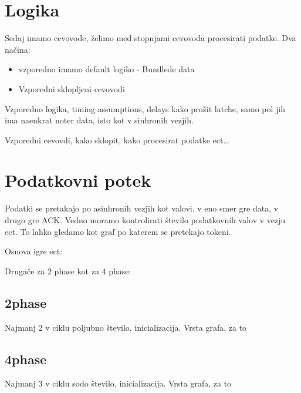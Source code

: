 %
%
%
%

\section{Logika} \label{a}

Sedaj imamo cevovode, želimo med stopnjami cevovoda procesirati podatke. Dva načina:
\begin{itemize}
	\item vzporedno imamo default logiko - Bundlede data
	\item Vzporedni sklopljeni cevovodi
\end{itemize}

Vzporedno logika, timing assumptions, delays kako prožit latche, samo pol jih ima naenkrat noter data, isto kot v sinhronih vezjih.

Vzporedni cevovdi, kako sklopit, kako procesirat podatke ect...






\section{Podatkovni potek} \label{a}
Podatki se pretakajo po asinhronih vezjih kot valovi. v eno smer gre data, v drugo gre ACK. Vedno moramo kontrolirati število podatkovnih valov v vezju ect.
To lahko gledamo kot graf po katerem se pretekajo tokeni. 

Osnova igre ect:

Drugače za 2 phase kot za 4 phase:

\subsection{2phase} \label{b}
Najmanj 2 v ciklu poljubno število, inicializacija. Vrsta grafa, za to

\subsection{4phase} \label{b}
Najmanj 3 v ciklu sodo število, inicializacija. Vrsta grafa, za to

